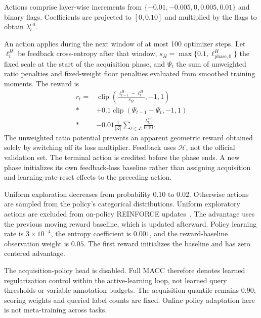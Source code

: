 \documentclass[a4paper,fleqn]{cas-dc}
\newcommand{\Clip}{\operatorname{clip}}
\begin{document}
Actions comprise layer-wise increments from
$\{-0.01,-0.005,0,0.005,0.01\}$ and binary flags.
Coefficients are projected to $[0,0.10]$ and multiplied by the
flags to obtain $\lambda_l^{\mathrm{eff}}$.

An action applies during the next window of at most 100 optimizer
steps. Let $\ell_t^H$ be feedback cross-entropy after that window,
$s_H=\max\{0.1,\ell^H_{\mathrm{phase},0}\}$ the fixed scale at the
start of the acquisition phase, and $\Psi_t$ the sum of unweighted
ratio penalties and fixed-weight floor penalties evaluated from
smoothed training moments. The reward is
\begin{align}
 r_t={}&
 \Clip\!\left(
 \frac{\ell_{t-1}^H-\ell_t^H}{s_H},-1,1\right)
 \nonumber\\*
 &+0.1\Clip(\Psi_{t-1}-\Psi_t,-1,1)
 \nonumber\\*
 &-0.01\frac1{|\mathcal L|}
 \sum_{l\in\mathcal L}\frac{\lambda_{l,t}^{\mathrm{eff}}}{0.10}.
 \label{eq:reward}
\end{align}
The unweighted ratio potential prevents an apparent geometric reward
obtained solely by switching off its loss multiplier.
Feedback uses $\mathcal H$, not the official validation set.
The terminal action is credited before the phase ends.
A new phase initializes its own feedback-loss baseline rather than
assigning acquisition and learning-rate-reset effects to the preceding
action.

Uniform exploration decreases from probability $0.10$ to $0.02$.
Otherwise actions are sampled from the policy's categorical
distributions. Uniform exploratory actions are excluded from
on-policy REINFORCE updates~\cite{williams1992}.
The advantage uses the previous moving reward baseline, which is
updated afterward. Policy learning rate is $3\times10^{-4}$,
the entropy coefficient is $0.001$, and the reward-baseline
observation weight is $0.05$. The first reward initializes the
baseline and has zero centered advantage.

The acquisition-policy head is disabled. Full MACC therefore denotes
learned regularization control within the active-learning loop,
not learned query thresholds or variable annotation budgets.
The acquisition quantile remains $0.90$; scoring weights and queried
label counts are fixed. Online policy adaptation here is not
meta-training across tasks.
\end{document}
